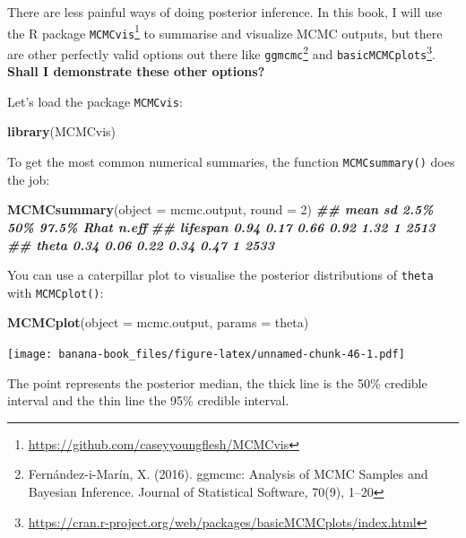 \documentclass[
  12pt,
]{krantz}
\newenvironment{Shaded}{\begin{snugshade}}{\end{snugshade}}
\newcommand{\AttributeTok}[1]{\textcolor[rgb]{0.13,0.29,0.53}{#1}}
\newcommand{\DecValTok}[1]{\textcolor[rgb]{0.00,0.00,0.81}{#1}}
\newcommand{\DocumentationTok}[1]{\textcolor[rgb]{0.56,0.35,0.01}{\textbf{\textit{#1}}}}
\newcommand{\FunctionTok}[1]{\textcolor[rgb]{0.13,0.29,0.53}{\textbf{#1}}}
\newcommand{\NormalTok}[1]{#1}
\newcommand{\StringTok}[1]{\textcolor[rgb]{0.31,0.60,0.02}{#1}}
\begin{document}
There are less painful ways of doing posterior inference. In this book, I will use the R package \texttt{MCMCvis}\footnote{\url{https://github.com/caseyyoungflesh/MCMCvis}} to summarise and visualize MCMC outputs, but there are other perfectly valid options out there like \texttt{ggmcmc}\footnote{Fernández-i-Marín, X. (2016). ggmcmc: Analysis of MCMC Samples and Bayesian Inference. Journal of Statistical Software, 70(9), 1--20} and \texttt{basicMCMCplots}\footnote{\url{https://cran.r-project.org/web/packages/basicMCMCplots/index.html}}. \textbf{Shall I demonstrate these other options?}

Let's load the package \texttt{MCMCvis}:

\begin{Shaded}
\begin{Highlighting}[]
\FunctionTok{library}\NormalTok{(MCMCvis)}
\end{Highlighting}
\end{Shaded}

To get the most common numerical summaries, the function \texttt{MCMCsummary()} does the job:

\begin{Shaded}
\begin{Highlighting}[]
\FunctionTok{MCMCsummary}\NormalTok{(}\AttributeTok{object =}\NormalTok{ mcmc.output, }\AttributeTok{round =} \DecValTok{2}\NormalTok{)}
\DocumentationTok{\#\#          mean   sd 2.5\%  50\% 97.5\% Rhat n.eff}
\DocumentationTok{\#\# lifespan 0.94 0.17 0.66 0.92  1.32    1  2513}
\DocumentationTok{\#\# theta    0.34 0.06 0.22 0.34  0.47    1  2533}
\end{Highlighting}
\end{Shaded}

You can use a caterpillar plot to visualise the posterior distributions of \texttt{theta} with \texttt{MCMCplot()}:

\begin{Shaded}
\begin{Highlighting}[]
\FunctionTok{MCMCplot}\NormalTok{(}\AttributeTok{object =}\NormalTok{ mcmc.output, }
         \AttributeTok{params =} \StringTok{\textquotesingle{}theta\textquotesingle{}}\NormalTok{)}
\end{Highlighting}
\end{Shaded}

\texttt{[image: banana-book\_files/figure-latex/unnamed-chunk-46-1.pdf]}

The point represents the posterior median, the thick line is the 50\% credible interval and the thin line the 95\% credible interval.
\end{document}
